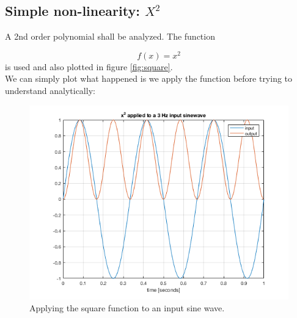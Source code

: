 



\subsection{Simple non-linearity: \(X ^2\)} %
\label{sub:nonLinearTrans}

A 2nd order polynomial shall be analyzed. The function

\begin{equation}
f(x) = x ^ 2
\end{equation}
 is used and also plotted in figure \ref{fig:square}.\\


We can simply plot what happened is we apply the function before trying to understand analytically:


\begin{figure}[H]
	\begin{center}
		\includegraphics[width = 14cm]{img/sinSquared.png}
		\caption{Applying the square function to an input sine wave.}
		\label{fig:sinSquared}
	\end{center}
\end{figure}


